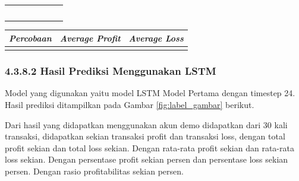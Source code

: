 \begin{table}[H]
\begin{tabular}{|c|c|l|l|l|l|l|}
  \multicolumn{1}{|l|}{} & \multicolumn{1}{l|}{} &               &  &                                         &                                      &               \\ \cline{1-3} \cline{5-7} 
  \multicolumn{1}{|l|}{} & \multicolumn{1}{l|}{} &               &  &                                         &                                      &               \\ \cline{1-3} \cline{5-7} 
  \multicolumn{1}{|l|}{} & \multicolumn{1}{l|}{} &               &  &                                         &                                      &               \\ \cline{1-3} \cline{5-7} 
  \multicolumn{1}{|l|}{} & \multicolumn{1}{l|}{} &               &  &                                         &                                      &               \\ \cline{1-3} \cline{5-7} 
  \multicolumn{1}{|l|}{} & \multicolumn{1}{l|}{} &               &  &                                         &                                      &               \\ \cline{1-3} \cline{5-7} 
  \end{tabular}
  \end{table}


\begin{table}[H]
  \centering
    \begin{tabular}{|c|c|l|}
    \hline
    \textit{Percobaan} & \textit{Average Profit} & \textit{Average Loss} \\ \hline
                       &                         &                       \\ \hline
    \end{tabular}
\end{table}

\subsubsection*{4.3.8.2 Hasil Prediksi Menggunakan LSTM}
Model yang digunakan yaitu model LSTM Model Pertama dengan timestep 24. Hasil prediksi ditampilkan pada Gambar \ref{fig:label_gambar} berikut.


Dari hasil yang didapatkan menggunakan akun demo didapatkan dari 30 kali transaksi, didapatkan sekian transaksi profit dan transaksi loss, dengan total profit sekian dan total loss sekian. Dengan rata-rata profit sekian dan rata-rata loss sekian. Dengan persentase profit sekian persen dan persentase loss sekian persen. Dengan rasio profitabilitas sekian persen.

